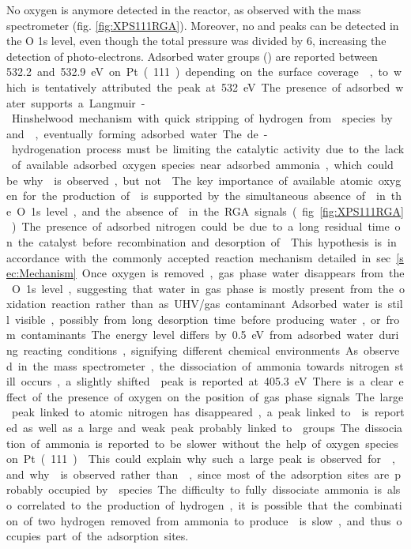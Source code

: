 No oxygen is anymore detected in the reactor, as observed with the mass spectrometer (fig. \ref{fig:XPS111RGA}).
Moreover, no  and  peaks can be detected in the O 1s level, even though the total pressure was divided by \num{6}, increasing the detection of photo-electrons.
Adsorbed water groups () are reported between \qty{532.2} and \qty{532.9} eV on Pt(111) depending on the surface coverage \parencite{Fisher1980, Kiskinova1985}, to which is tentatively attributed the peak at \qty{532}{\eV}.

The presence of adsorbed water supports a Langmuir-Hinshelwood mechanism with quick stripping of hydrogen from  species by  and , eventually forming adsorbed water.
The de-hydrogenation process must be limiting the catalytic activity due to the lack of available adsorbed oxygen species near adsorbed ammonia, which could be why  is observed, but not .
The key importance of available atomic oxygen for the production of  is supported by the simultaneous absence of  in the O 1s level, and the absence of  in the RGA signals (fig. \ref{fig:XPS111RGA}).
The presence of adsorbed nitrogen could be due to a long residual time on the catalyst before recombination and desorption of .
This hypothesis is in accordance with the commonly accepted reaction mechanism detailed in sec. \ref{sec:Mechanism}.

Once oxygen is removed, gas phase water disappears from the O 1s level, suggesting that water in gas phase is mostly present from the oxidation reaction rather than as UHV/gas contaminant.
Adsorbed water is still visible, possibly from long desorption time before producing water, or from contaminants.
The energy level differs by \qty{0.5}{\eV} from adsorbed water during reacting conditions, signifying different chemical environments.

As observed in the mass spectrometer, the dissociation of ammonia towards nitrogen still occurs, a slightly shifted  peak is reported at \qty{405.3}{\eV}.
There is a clear effect of the presence of oxygen on the position of gas phase signals.
The large peak linked to atomic nitrogen has disappeared, a peak linked to  is reported as well as a large and weak peak probably linked to  groups.
The dissociation of ammonia is reported to be slower without the help of oxygen species on Pt(111) \parencite{Offermans2006,Offermans2007, Imbihl2007, NovellLeruth2008}.
This could explain why such a large peak is observed for , and why  is observed rather than , since most of the adsorption sites are probably occupied by  species.
The difficulty to fully dissociate ammonia is also correlated to the production of hydrogen, it is possible that the combination of two hydrogen removed from ammonia to produce  is slow, and thus occupies part of the adsorption sites.

